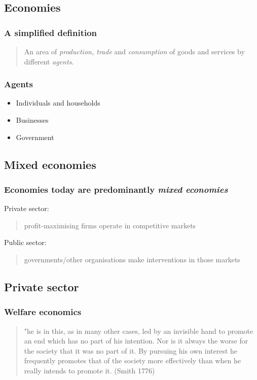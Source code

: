 \subsection{Economies}
\subsubsection{A simplified definition}
\begin{quote}
  An area of \textit{production, trade} and \textit{consumption} of goods and services by different \textit{agents}.
\end{quote}
\subsubsection{Agents}
\begin{itemize}
  \item Individuals and households
  \item Businesses
  \item Government
\end{itemize}
\subsection{Mixed economies}
\subsubsection{Economies today are predominantly \textit{mixed economies}}
Private sector:
\begin{quote}
  profit-maximising firms operate in competitive markets
\end{quote}
Public sector:
\begin{quote}
  governments/other organisations make interventions in those markets
\end{quote}
\subsection{Private sector}
\subsubsection{Welfare economics}
\begin{quote}
  "he is in this, as in many other cases, led by an invisible hand to promote an end which has no part of his intention. Nor is it always the worse for the society that it was no part of it. By pursuing his own interest he frequently promotes that of the society more effectively than when he really intends to promote it. (Smith 1776)
\end{quote}
